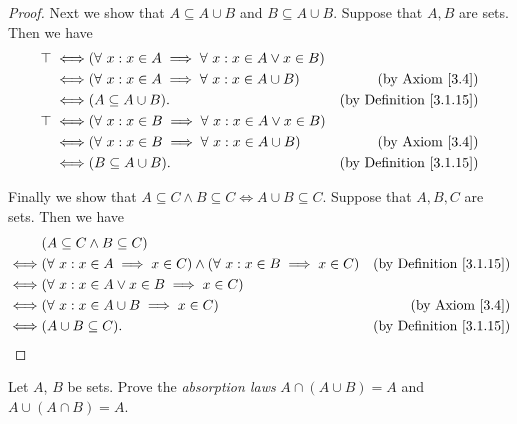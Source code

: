 \begin{proof}
    Next we show that \(A \subseteq A \cup B\) and \(B \subseteq A \cup B\).
    Suppose that \(A, B\) are sets.
    Then we have
    \begin{align*}
        \top \iff & (\forall\ x : x \in A \implies \forall\ x : x \in A \lor x \in B)                                       \\
        \iff      & (\forall\ x : x \in A \implies \forall\ x : x \in A \cup B)       & \text{(by Axiom \ref{3.4})}         \\
        \iff      & (A \subseteq A \cup B).                                           & \text{(by Definition \ref{3.1.15})} \\
        \top \iff & (\forall\ x : x \in B \implies \forall\ x : x \in A \lor x \in B)                                       \\
        \iff      & (\forall\ x : x \in B \implies \forall\ x : x \in A \cup B)       & \text{(by Axiom \ref{3.4})}         \\
        \iff      & (B \subseteq A \cup B).                                           & \text{(by Definition \ref{3.1.15})}
    \end{align*}

    Finally we show that \(A \subseteq C \land B \subseteq C \iff A \cup B \subseteq C\).
    Suppose that \(A, B, C\) are sets.
    Then we have
    \begin{align*}
             & (A \subseteq C \land B \subseteq C)                                                                                         \\
        \iff & (\forall\ x : x \in A \implies x \in C) \land (\forall\ x : x \in B \implies x \in C) & \text{(by Definition \ref{3.1.15})} \\
        \iff & (\forall\ x : x \in A \lor x \in B \implies x \in C)                                                                        \\
        \iff & (\forall\ x : x \in A \cup B \implies x \in C)                                        & \text{(by Axiom \ref{3.4})}         \\
        \iff & (A \cup B \subseteq C).                                                               & \text{(by Definition \ref{3.1.15})}
    \end{align*}
\end{proof}

\begin{exercise}\label{ex 3.1.8}
    Let \(A\), \(B\) be sets.
    Prove the \emph{absorption laws} \(A \cap (A \cup B) = A\) and \(A \cup (A \cap B) = A\).
\end{exercise}

